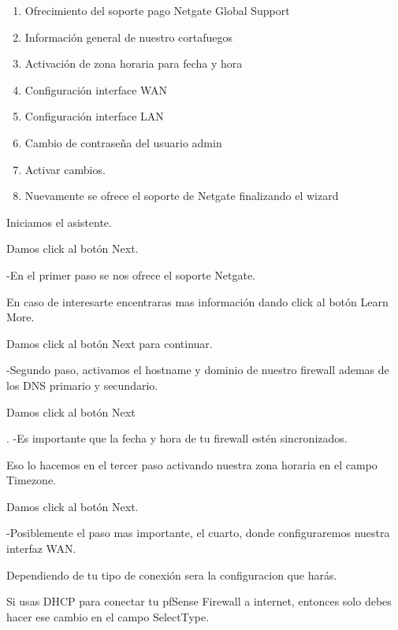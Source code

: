 \documentclass[12pt,letterspaper]{report}
\begin{document}
\begin{enumerate}
\item Ofrecimiento del soporte pago Netgate Global Support\par
\item Información general de nuestro cortafuegos\par
\item Activación de zona horaria para fecha y hora\par
\item Configuración interface WAN\par
\item Configuración interface LAN\par
\item Cambio de contraseña del usuario admin\par
\item Activar cambios.
\item Nuevamente se ofrece el soporte de Netgate finalizando el wizard\par
\end{enumerate}
\vspace {0.3cm}
Iniciamos el asistente.\par
\vspace {0.3cm}
Damos click al botón Next.\par
\vspace {0.3cm}
-En el primer paso se nos ofrece el soporte Netgate.\par
\vspace {0.3cm}
En caso de interesarte encentraras mas información dando click al botón Learn More.\par
\vspace {0.3cm}
Damos click al botón Next para continuar.\par
\vspace {0.3cm}
-Segundo paso, activamos el hostname y dominio de nuestro firewall ademas de los DNS primario y secundario.\par
\vspace {0.3cm}
Damos click al botón Next\par.
\vspace {0.3cm}
-Es importante que la fecha y hora de tu firewall estén sincronizados.\par
\vspace {0.3cm}
Eso lo hacemos en el tercer paso activando nuestra zona horaria en el campo Timezone.\par
\vspace {0.3cm}
Damos click al botón Next.\par
\vspace {0.3cm}
-Posiblemente el paso mas importante, el cuarto, donde configuraremos nuestra interfaz WAN.\par
\vspace {0.3cm}
Dependiendo de tu tipo de conexión sera la configuracion que harás.\par
\vspace {0.3cm}
Si usas DHCP para conectar tu pfSense Firewall a internet, entonces solo debes hacer ese cambio en el campo SelectType.\par
\end{document}

